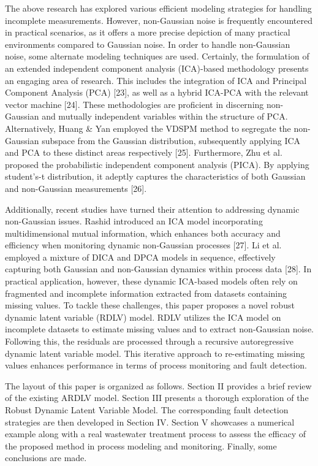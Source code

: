 \documentclass[journal]{IEEEtranTICPS}
\begin{document}
The above research has explored various efficient modeling strategies for handling incomplete measurements. However, non-Gaussian noise is frequently encountered in practical scenarios, as it offers a more precise depiction of many practical environments compared to Gaussian noise. In order to handle non-Gaussian noise, some alternate modeling techniques are used. Certainly, the formulation of an extended independent component analysis (ICA)-based methodology presents an engaging area of research. This includes the integration of ICA and Principal Component Analysis (PCA) [23], as well as a hybrid ICA-PCA with the relevant vector machine [24]. These methodologies are proficient in discerning non-Gaussian and mutually independent variables within the structure of PCA. Alternatively, Huang \& Yan employed the VDSPM method to segregate the non-Gaussian subspace from the Gaussian distribution, subsequently applying ICA and PCA to these distinct areas respectively [25]. Furthermore, Zhu et al. proposed the probabilistic independent component analysis (PICA). By applying student's-t distribution, it adeptly captures the characteristics of both Gaussian and non-Gaussian measurements [26].

Additionally, recent studies have turned their attention to addressing dynamic non-Gaussian issues. Rashid introduced an ICA model incorporating multidimensional mutual information, which enhances both accuracy and efficiency when monitoring dynamic non-Gaussian processes [27]. Li et al. employed a mixture of DICA and DPCA models in sequence, effectively capturing both Gaussian and non-Gaussian dynamics within process data [28]. In practical application, however, these dynamic ICA-based models often rely on fragmented and incomplete information extracted from datasets containing missing values. To tackle these challenges, this paper proposes a novel robust dynamic latent variable (RDLV) model. RDLV utilizes the ICA model on incomplete datasets to estimate missing values and to extract non-Gaussian noise. Following this, the residuals are processed through a recursive autoregressive dynamic latent variable model. This iterative approach to re-estimating missing values enhances performance in terms of process monitoring and fault detection.

The layout of this paper is organized as follows. Section II provides a brief review of the existing ARDLV model. Section III presents a thorough exploration of the Robust Dynamic Latent Variable Model. The corresponding fault detection strategies are then developed in Section IV. Section V showcases a numerical example along with a real wastewater treatment process to assess the efficacy of the proposed method in process modeling and monitoring. Finally, some conclusions are made.
\end{document}
